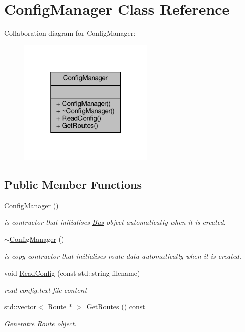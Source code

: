 \hypertarget{classConfigManager}{}\section{Config\+Manager Class Reference}
\label{classConfigManager}


Collaboration diagram for Config\+Manager\+:
\nopagebreak
\begin{figure}[H]
\begin{center}
\leavevmode
\includegraphics[width=184pt]{classConfigManager__coll__graph}
\end{center}
\end{figure}
\subsection*{Public Member Functions}
\begin{DoxyCompactItemize}
\item 
\hyperlink{classConfigManager_a7d3d7c10423d969f7544509f6fcca32f}{Config\+Manager} ()
\begin{DoxyCompactList}\small\item\em is contructor that initialises \hyperlink{classBus}{Bus} object automatically when it is created. \end{DoxyCompactList}\item 
\hyperlink{classConfigManager_a7fa65fdff98bdd5bbbf72196bd9ccf17}{$\sim$\+Config\+Manager} ()
\begin{DoxyCompactList}\small\item\em is copy contructor that initialises route data automatically when it is created. \end{DoxyCompactList}\item 
void \hyperlink{classConfigManager_ab8087a9f44ddaa001ea361b56514e64a}{Read\+Config} (const std\+::string filename)
\begin{DoxyCompactList}\small\item\em read config.\+text file content \end{DoxyCompactList}\item 
std\+::vector$<$ \hyperlink{classRoute}{Route} $\ast$ $>$ \hyperlink{classConfigManager_a0db6329b7dd5ac1f92ee262c30df4ef9}{Get\+Routes} () const
\begin{DoxyCompactList}\small\item\em Generatre \hyperlink{classRoute}{Route} object. \end{DoxyCompactList}\end{DoxyCompactItemize}


